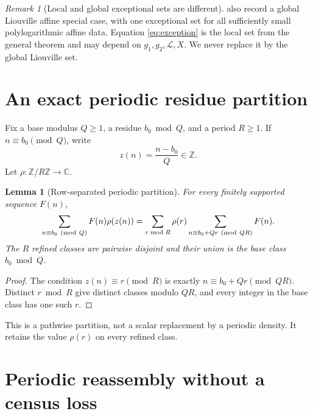 \documentclass[11pt]{article}
\newtheorem{lemma}[theorem]{Lemma}
\theoremstyle{definition}
\theoremstyle{remark}
\newtheorem{remark}[theorem]{Remark}
\begin{document}
\begin{remark}[Local and global exceptional sets are different]
\label{rem:local-global}
 also record a global Liouville
affine special case, with one exceptional set for all sufficiently
small polylogarithmic affine data.  Equation \eqref{eq:exception} is
the local set from the general theorem and may depend on
\(g_1,g_2,\mathcal L,X\).  We never replace it by the global
Liouville set.
\end{remark}

\section{An exact periodic residue partition}

Fix a base modulus \(Q\ge1\), a residue \(b_0\bmod Q\), and a
period \(R\ge1\).  If \(n\equiv b_0\pmod Q\), write
\[
 z(n)=\frac{n-b_0}{Q}\in\mathbb Z.
\]
Let \(\rho:\mathbb Z/R\mathbb Z\to\mathbb C\).

\begin{lemma}[Row-separated periodic partition]
\label{lem:partition}
For every finitely supported sequence \(F(n)\),
\begin{equation}
 \sum_{n\equiv b_0\ ({\rm mod}\ Q)}
 F(n)\rho(z(n))
 =
 \sum_{r\bmod R}\rho(r)
 \sum_{n\equiv b_0+Qr\ ({\rm mod}\ QR)}F(n).
\label{eq:partition}
\end{equation}
The \(R\) refined classes are pairwise disjoint and their union is
the base class \(b_0\bmod Q\).
\end{lemma}

\begin{proof}
The condition \(z(n)\equiv r\pmod R\) is exactly
\(n\equiv b_0+Qr\pmod{QR}\).  Distinct \(r\bmod R\) give distinct
classes modulo \(QR\), and every integer in the base class has one
such \(r\).
\end{proof}

This is a pathwise partition, not a scalar replacement by a periodic
density.  It retains the value \(\rho(r)\) on every refined class.

\section{Periodic reassembly without a census loss}
\end{document}
